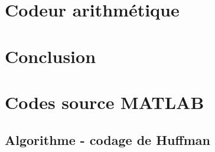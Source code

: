 \documentclass[a4paper, 12pt]{article}
\newcommand{\FSource}[1]{%

}
\begin{document}
\section{Codeur arithmétique}

\section{Conclusion}


\clearpage
\appendix

\section{Codes source MATLAB}
\subsection{Algorithme - codage de Huffman}\label{algohuffman}

\FSource{../huffman.m}
\end{document}
